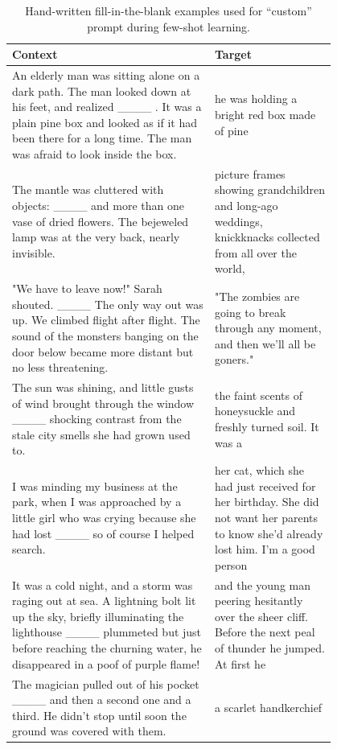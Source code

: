 \begin{table}
    \centering
    \small
    \begin{tabular}{|p{0.5\linewidth}|p{0.3\linewidth}|}
         \hline
         \textbf{Context} & \textbf{Target} \\
         \hline
An elderly man was sitting alone on a dark path. The man looked down at his feet, and realized \_\_\_\_ . It was a plain pine box and looked as if it had been there for a long time. The man was afraid to look inside the box. & he was holding a bright red box made of pine \\
\arrayrulecolor{lg} \hline \arrayrulecolor{black}
The mantle was cluttered with objects: \_\_\_\_ and more than one vase of dried flowers. The bejeweled lamp was at the very back, nearly invisible. & picture frames showing grandchildren and long-ago weddings, knickknacks collected from all over the world, \\
\arrayrulecolor{lg} \hline \arrayrulecolor{black}
"We have to leave now!" Sarah shouted. \_\_\_\_ The only way out was up. We climbed flight after flight. The sound of the monsters banging on the door below became more distant but no less threatening. & "The zombies are going to break through any moment, and then we'll all be goners." \\
\arrayrulecolor{lg} \hline \arrayrulecolor{black}
The sun was shining, and little gusts of wind brought through the window \_\_\_\_ shocking contrast from the stale city smells she had grown used to. & the faint scents of honeysuckle and freshly turned soil. It was a \\
\arrayrulecolor{lg} \hline \arrayrulecolor{black}
I was minding my business at the park, when I was approached by a little girl who was crying because she had lost \_\_\_\_ so of course I helped search. & her cat, which she had just received for her birthday. She did not want her parents to know she'd already lost him. I'm a good person \\
\arrayrulecolor{lg} \hline \arrayrulecolor{black}
It was a cold night, and a storm was raging out at sea. A lightning bolt lit up the sky, briefly illuminating the lighthouse \_\_\_\_ plummeted but just before reaching the churning water, he disappeared in a poof of purple flame! & and the young man peering hesitantly over the sheer cliff. Before the next peal of thunder he jumped. At first he  \\
\arrayrulecolor{lg} \hline \arrayrulecolor{black}
The magician pulled out of his pocket \_\_\_\_ and then a second one and a third. He didn't stop until soon the ground was covered with them. & a scarlet handkerchief  \\
         \hline
    \end{tabular}
    \caption{Hand-written fill-in-the-blank examples used for ``custom'' prompt during few-shot learning.}
    \label{tab:custom_examples}
\end{table}



